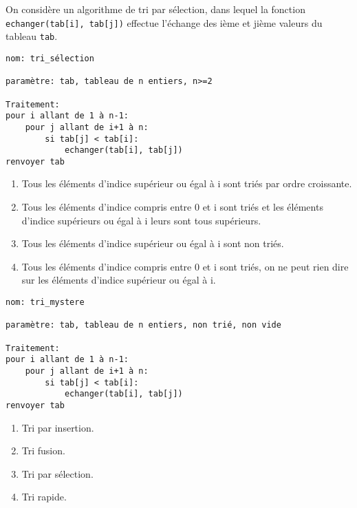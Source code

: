 
On considère un algorithme de tri par sélection, dans lequel la fonction \texttt{echanger(tab[i], tab[j])}
effectue l'échange des ième et jième valeurs du tableau \texttt{tab}.
\begin{lstlisting}
nom: tri_sélection

paramètre: tab, tableau de n entiers, n>=2

Traitement:
pour i allant de 1 à n-1:
    pour j allant de i+1 à n:
        si tab[j] < tab[i]:
            echanger(tab[i], tab[j])
renvoyer tab
\end{lstlisting}
\begin{enumerate}
\item Tous les éléments d'indice supérieur ou égal à i sont triés par ordre croissante.
\item Tous les éléments d'indice compris entre 0 et i sont triés et les éléments d'indice supérieurs ou égal à i leurs sont tous supérieurs.
\item Tous les éléments d'indice supérieur ou égal à i sont non triés.
\item Tous les éléments d'indice compris entre 0 et i sont triés, on ne peut rien dire sur les éléments d'indice supérieur ou égal à i.
\end{enumerate}

\begin{lstlisting}
nom: tri_mystere

paramètre: tab, tableau de n entiers, non trié, non vide

Traitement:
pour i allant de 1 à n-1:
    pour j allant de i+1 à n:
        si tab[j] < tab[i]:
            echanger(tab[i], tab[j])
renvoyer tab
\end{lstlisting}
\begin{enumerate}
\item Tri par insertion. 
\item Tri fusion.
\item Tri par sélection. %
\item Tri rapide.
\end{enumerate}

